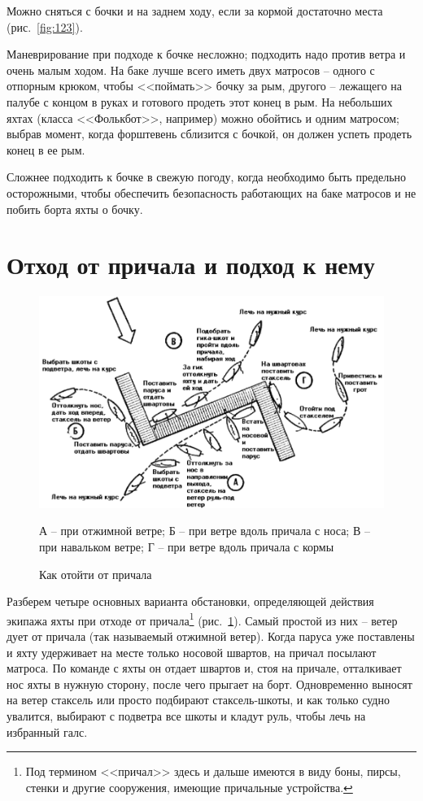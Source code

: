 \documentclass[a4paper, 12pt, twoside, final]{scrbook}
\begin{document}
Можно сняться с бочки и на заднем ходу, если за кормой достаточно места (рис.~\ref{fig:123}).

Маневрирование при подходе к бочке несложно; подходить надо против ветра и очень малым ходом. На баке лучше всего иметь двух матросов \--- одного с отпорным крюком, чтобы <<поймать>> бочку за рым, другого \--- лежащего на палубе с концом в руках и готового продеть этот конец в рым. На небольших яхтах (класса <<Фолькбот>>, например) можно обойтись и одним матросом; выбрав момент, когда форштевень сблизится с бочкой, он должен успеть продеть конец в ее рым.

Сложнее подходить к бочке в свежую погоду, когда необходимо быть предельно осторожными, чтобы обеспечить безопасность работающих на баке матросов и не побить борта яхты о бочку.

\section{Отход от причала и подход к нему}

\begin{figure}[htbp]
   \centering
   \includegraphics{124_Kak_ot_prichala} %
   \caption{Как отойти от причала}
   \label{fig:124}
   \centering\small
   А \--- при отжимной ветре; Б \--- при ветре вдоль причала с носа; В \--- при навальком ветре; Г \--- при ветре вдоль причала с кормы
\end{figure}

Разберем четыре основных варианта обстановки, определяющей действия экипажа яхты при отходе от причала\footnote{Под термином <<причал>> здесь и дальше имеются в виду боны, пирсы, стенки и другие сооружения, имеющие причальные устройства.} (рис.~\ref{fig:124}). Самый простой из них \--- ветер дует от причала (так называемый отжимной ветер). Когда паруса уже поставлены и яхту удерживает на месте только носовой швартов, на причал посылают матроса. По команде с яхты он отдает швартов и, стоя на причале, отталкивает нос яхты в нужную сторону, после чего прыгает на борт. Одновременно выносят на ветер стаксель или просто подбирают стаксель-шкоты, и как только судно увалится, выбирают с подветра все шкоты и кладут руль, чтобы лечь на избранный галс. 
\end{document}
